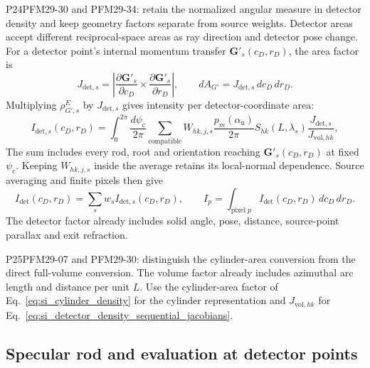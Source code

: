 \begin{reviewchange}{P24}{PFM29-30 and PFM29-34: retain the normalized angular measure in detector density and keep geometry factors separate from source weights.}
Detector areas accept different reciprocal-space areas as ray direction and detector pose change. For a detector point's internal momentum transfer $\mathbf G'_s(c_D,r_D)$, the area factor is
\begin{equation}
  J_{\mathrm{det},s}
  =\left|
  \frac{\partial{\mathbf G'}_s}{\partial c_D}
  \times
  \frac{\partial{\mathbf G'}_s}{\partial r_D}
  \right|,
  \qquad
  dA_{G'}=J_{\mathrm{det},s}\,dc_D\,dr_D.
  \label{eq:si_detector_surface_jacobian}
\end{equation}
Multiplying $\rho_{G',s}^E$ by $J_{\mathrm{det},s}$ gives intensity per detector-coordinate area:
\begin{equation}
  I_{\mathrm{det},s}(c_D,r_D)
  =\int_0^{2\pi}\frac{d{\psi_{\mathrm c}}}{2\pi}\sum_{\mathrm{compatible}}
  W_{hk,j,s}
  \frac{p_m({\alpha_{\mathrm n}})}{2\pi}S_{hk}(L,\lambda_s)
  \frac{J_{\mathrm{det},s}}{J_{\mathrm{vol},hk}},
  \label{eq:si_detector_density_sequential_jacobians}
\end{equation}
The sum includes every rod, root and orientation reaching $\mathbf G'_s(c_D,r_D)$ at fixed $\psi_{\mathrm c}$. Keeping $W_{hk,j,s}$ inside the average retains its local-normal dependence. Source averaging and finite pixels then give
\begin{equation}
  I_{\mathrm{det}}(c_D,r_D)=\sum_s w_sI_{\mathrm{det},s}(c_D,r_D),
  \qquad
  I_p=\int_{\mathrm{pixel}\;p}I_{\mathrm{det}}(c_D,r_D)\,dc_D\,dr_D.
  \label{eq:si_source_sum_and_pixel_mass}
\end{equation}
The detector factor already includes solid angle, pose, distance, source-point parallax and exit refraction.
\end{reviewchange}

\begin{reviewchange}{P25}{PFM29-07 and PFM29-30: distinguish the cylinder-area conversion from the direct full-volume conversion.}
The volume factor already includes azimuthal arc length and distance per unit $L$. Use the cylinder-area factor of Eq.~\eqref{eq:si_cylinder_density} for the cylinder representation and $J_{\mathrm{vol},hk}$ for Eq.~\eqref{eq:si_detector_density_sequential_jacobians}.
\end{reviewchange}

\subsection{Specular rod and evaluation at detector points}

